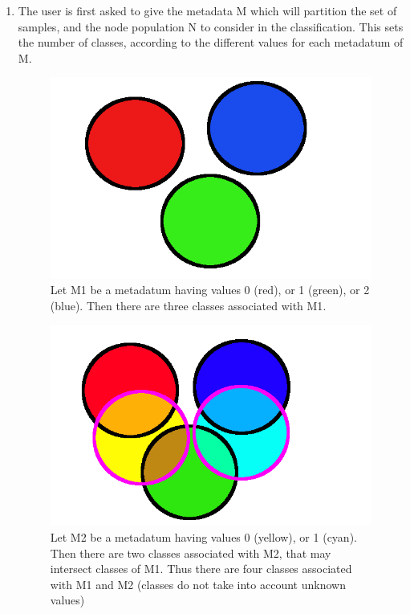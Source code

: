 \documentclass{report}
\begin{document}
\begin{enumerate}
\item The user is first asked to give the metadata \textsc{M} which will partition the set of samples, and the node population \textsc{N} to consider in the classification. This sets the number of classes, according to the different values for each metadatum of \textsc{M}.

\begin{figure}[H]
\centering
\includegraphics[scale=0.3]{illustrations/classessimples.png}
\caption{Let \textsc{M1} be a metadatum having values 0 (red), or 1 (green), or 2 (blue). Then there are three classes associated with \textsc{M1}.}
\end{figure}

\begin{figure}[H]
\centering
\includegraphics[scale=0.3]{illustrations/classescomplexes.png}
\caption{Let M2 be a metadatum having values 0 (yellow), or 1 (cyan). Then there are two classes associated with M2, that may intersect classes of M1. Thus there are four classes associated with M1 and M2 (classes do not take into account unknown values)}
\end{figure}


\end{enumerate}
\end{document}
